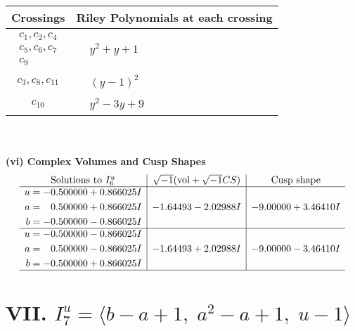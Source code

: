 \documentclass[1p]{elsarticle_modified}
\theoremstyle{definition}
\newcommand{\I}{\sqrt{-1}}
\begin{document}
\begin{tabular}{m{50pt}|m{274pt}}
Crossings & \hspace{64pt}Riley Polynomials at each crossing \\
\hline $$\begin{aligned}c_{1},c_{2},c_{4}\\c_{5},c_{6},c_{7}\\c_{9}\end{aligned}$$&$\begin{aligned}
&y^2+y+1
\end{aligned}$\\
\hline $$\begin{aligned}c_{3},c_{8},c_{11}\end{aligned}$$&$\begin{aligned}
&(y-1)^2
\end{aligned}$\\
\hline $$\begin{aligned}c_{10}\end{aligned}$$&$\begin{aligned}
&y^2-3 y+9
\end{aligned}$\\
\hline
\end{tabular}\\~\\
\newpage\flushleft \textbf{(vi) Complex Volumes and Cusp Shapes}
$$\begin{array}{c|c|c}  
\text{Solutions to }I^u_{6}& \I (\text{vol} + \sqrt{-1}CS) & \text{Cusp shape}\\
 \hline 
\begin{aligned}
u &= -0.500000 + 0.866025 I \\
a &= \phantom{-}0.500000 + 0.866025 I \\
b &= -0.500000 - 0.866025 I\end{aligned}
 & -1.64493 - 2.02988 I & -9.00000 + 3.46410 I \\ \hline\begin{aligned}
u &= -0.500000 - 0.866025 I \\
a &= \phantom{-}0.500000 - 0.866025 I \\
b &= -0.500000 + 0.866025 I\end{aligned}
 & -1.64493 + 2.02988 I & -9.00000 - 3.46410 I\\
 \hline 
 \end{array}$$\newpage\newpage\renewcommand{\arraystretch}{1}
\centering \section*{VII. $I^u_{7}= \langle b- a+1,\;a^2- a+1,\;u-1 \rangle$}
\end{document}
